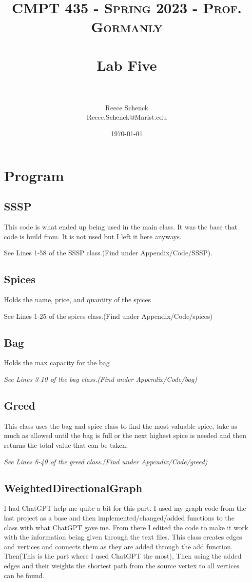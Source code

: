 \documentclass[10pt]{article}
\title{	
   \normalfont \normalsize 
   \textsc{CMPT 435 - Spring 2023 - Prof. Gormanly} \\[10pt] %
   \horrule{0.5pt} \\[0.25cm] 	%
   \huge Lab Five  \\     	    %
   \horrule{0.5pt} \\[0.25cm] 	%
}
\author{Reece Schenck \\ \normalsize Reece.Schenck@Marist.edu}
\date{\normalsize\today} 	%
\begin{document}
\maketitle %

\section{Program}

\subsection{SSSP}
This code is what ended up being used in the main class. It was the base that code is build from. It is not used but I left it here anyways.

See Lines 1-58 of the SSSP class.(Find under Appendix/Code/SSSP).

\subsection{Spices}
Holds the name, price, and quantity of the spices


See Lines 1-25 of the spices class.(Find under Appendix/Code/spices)

\subsection{Bag}
Holds the max capacity for the bag

\newline

\emph{\normalfont 
See Lines 3-10 of the bag class.(Find under Appendix/Code/bag)}

\subsection{Greed}
This class uses the bag and spice class to find the most valuable spice, take as much as allowed until the bag is full or the next highest spice is needed and then returns the total value that can be taken.

\newline

\emph{\normalfont 
See Lines 6-40 of the greed class.(Find under Appendix/Code/greed)}

\subsection{WeightedDirectionalGraph}
I had ChatGPT help me quite a bit for this part. I used my graph code from the last project as a base and then implemented/changed/added functions to the class with what ChatGPT gave me. From there I edited the code to make it work with the information being given through the text files. This class creates edges and vertices and connects them as they are added through the add function. Then(This is the part where I used  ChatGPT the most), Then using the added edges and their weights the shortest path from the source vertex to all vertices can be found.
\end{document}
